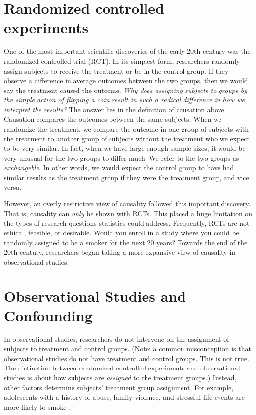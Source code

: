 \documentclass[
]{book}
\begin{document}
\hypertarget{randomized-controlled-experiments}{%
\section{Randomized controlled experiments}\label{randomized-controlled-experiments}}

One of the most important scientific discoveries of the early 20th century was the randomized controlled trial (RCT). In its simplest form, researchers randomly assign subjects to receive the treatment or be in the control group. If they observe a difference in average outcomes between the two groups, then we would say the treatment caused the outcome. \emph{Why does assigning subjects to groups by the simple action of flipping a coin result in such a radical difference in how we interpret the results?} The answer lies in the definition of causation above. Causation compares the outcomes between the same subjects. When we randomize the treatment, we compare the outcome in one group of subjects with the treatment to another group of subjects without the treatment who we expect to be very similar. In fact, when we have large enough sample sizes, it would be very unusual for the two groups to differ much. We refer to the two groups as \emph{exchangeble}. In other words, we would expect the control group to have had similar results as the treatment group if they were the treatment group, and vice versa.

However, an overly restrictive view of causality followed this important discovery. That is, causality can \emph{only} be shown with RCTs. This placed a huge limitation on the types of research questions statistics could address. Frequently, RCTs are not ethical, feasible, or desirable. Would you enroll in a study where you could be randomly assigned to be a smoker for the next 20 years? Towards the end of the 20th century, researchers began taking a more expansive view of causality in observational studies.

\hypertarget{observational-studies-and-confounding}{%
\section{Observational Studies and Confounding}\label{observational-studies-and-confounding}}

In observational studies, researchers do not intervene on the assignment of subjects to treatment and control groups. (Note: a common misconception is that observational studies do not have treatment and control groups. This is not true. The distinction between randomized controlled experiments and observational studies is about how subjects are \emph{assigned} to the treatment groups.) Instead, other factors determine subjects' treatment group assignment. For example, adolescents with a history of abuse, family violence, and stressful life events are more likely to smoke \citep{ellickson2001high, simantov2000health}.
\end{document}
